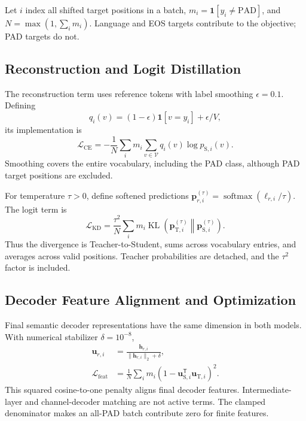 \documentclass[conference]{IEEEtran}
\begin{document}
Let $i$ index all shifted target positions in a batch, $m_i=\mathbf{1}[y_i\ne\mathrm{PAD}]$, and $N=\max(1,\sum_i m_i)$. Language and EOS targets contribute to the objective; PAD targets do not.

\subsection{Reconstruction and Logit Distillation}
The reconstruction term uses reference tokens with label smoothing $\epsilon=0.1$. Defining
\begin{equation}
 q_i(v)=(1-\epsilon)\mathbf{1}[v=y_i]+\epsilon/V,
\end{equation}
its implementation is
\begin{equation}
 \mathcal{L}_{\mathrm{CE}}=-\frac{1}{N}\sum_i m_i
 \sum_{v\in\mathcal{V}}q_i(v)\log p_{\mathrm{S},i}(v).
\end{equation}
Smoothing covers the entire vocabulary, including the PAD class, although PAD target positions are excluded.

For temperature $\tau>0$, define softened predictions $\mathbf{p}_{r,i}^{(\tau)}=\operatorname{softmax}(\boldsymbol{\ell}_{r,i}/\tau)$. The logit term is
\begin{equation}
 \mathcal{L}_{\mathrm{KD}}=\frac{\tau^2}{N}\sum_i m_i
 \operatorname{KL}\!\left(\mathbf{p}_{\mathrm{T},i}^{(\tau)}
 \middle\|\mathbf{p}_{\mathrm{S},i}^{(\tau)}\right).
\end{equation}
Thus the divergence is Teacher-to-Student, sums across vocabulary entries, and averages across valid positions. Teacher probabilities are detached, and the $\tau^2$ factor is included.

\subsection{Decoder Feature Alignment and Optimization}
Final semantic decoder representations have the same dimension in both models. With numerical stabilizer $\delta=10^{-8}$,
\begin{align}
 \mathbf{u}_{r,i}&=\frac{\mathbf{h}_{r,i}}{\|\mathbf{h}_{r,i}\|_2+\delta},\\
 \mathcal{L}_{\mathrm{feat}}&=\frac{1}{N}\sum_i m_i
 \left(1-\mathbf{u}_{\mathrm{S},i}^{\mathsf{T}}\mathbf{u}_{\mathrm{T},i}\right)^2.
\end{align}
This squared cosine-to-one penalty aligns final decoder features. Intermediate-layer and channel-decoder matching are not active terms. The clamped denominator makes an all-PAD batch contribute zero for finite features.
\end{document}
